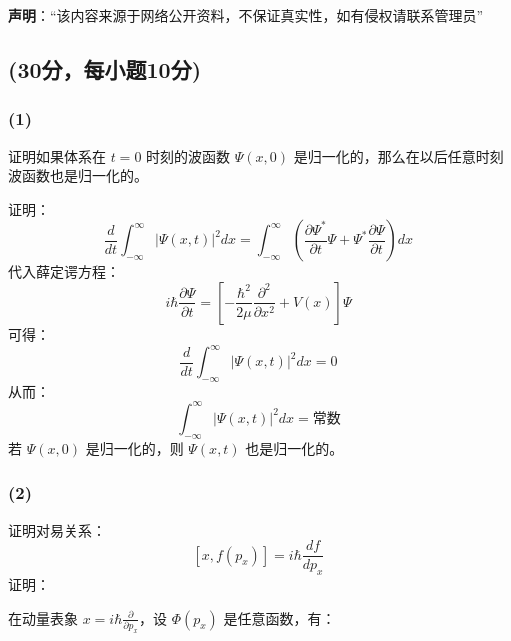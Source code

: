 
\textbf{声明}：“该内容来源于网络公开资料，不保证真实性，如有侵权请联系管理员”

\subsection{(30分，每小题10分)}
\subsubsection{(1)}
证明如果体系在 $t=0$ 时刻的波函数 $\Psi(x, 0)$ 是归一化的，那么在以后任意时刻波函数也是归一化的。

证明：
$$\frac{d}{dt} \int_{-\infty}^{\infty} \left| \Psi(x,t) \right|^2 dx = \int_{-\infty}^{\infty} \left( \frac{\partial \Psi^*}{\partial t} \Psi + \Psi^* \frac{\partial \Psi}{\partial t} \right) dx~$$
代入薛定谔方程：
$$i\hbar \frac{\partial \Psi}{\partial t} = \left[-\frac{\hbar^2}{2\mu} \frac{\partial^2}{\partial x^2} + V(x) \right] \Psi~$$
可得：
$$\frac{d}{dt} \int_{-\infty}^{\infty} \left| \Psi(x,t) \right|^2 dx = 0~$$
从而：
$$\int_{-\infty}^{\infty} \left| \Psi(x,t) \right|^2 dx = \text{常数}~$$
若 $\Psi(x, 0)$ 是归一化的，则 $\Psi(x,t)$ 也是归一化的。
\subsubsection{(2)}
证明对易关系：
$$\left[x, f(p_x)\right] = i\hbar \frac{df}{dp_x}~$$
证明：

在动量表象 $x = i\hbar \frac{\partial}{\partial p_x}$，设 $\Phi(p_x)$ 是任意函数，有：
